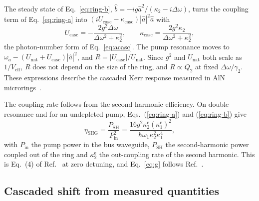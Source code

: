 \documentclass[9pt]{osa-supplemental-document}
\newcommand{\Dom}{\Delta\omega}
\begin{document}
The steady state of Eq.~\eqref{eq:ring-b},
$\hat b=-ig\hat a^2/(\kappa_2-i\Dom)$, turns the coupling term of
Eq.~\eqref{eq:ring-a} into $(iU_{\mathrm{casc}}-\kappa_{\mathrm{casc}})|\hat a|^2\hat a$
with
\begin{equation}
  U_{\mathrm{casc}}=-\frac{2g^2\Dom}{\Dom^2+\kappa_2^2},\qquad
  \kappa_{\mathrm{casc}}=\frac{2g^2\kappa_2}{\Dom^2+\kappa_2^2},
  \label{eq:Ucasc}
\end{equation}
the photon-number form of Eq.~\eqref{eq:acasc}.  The pump resonance moves to
$\omega_a-(U_{\mathrm{nat}}+U_{\mathrm{casc}})|\hat a|^2$, and
$R=|U_{\mathrm{casc}}|/U_{\mathrm{nat}}$.  Since $g^2$ and
$U_{\mathrm{nat}}$ both scale as $1/V_{\mathrm{eff}}$, $R$ does not depend on
the size of the ring, and $R\propto Q_2$ at fixed $\Dom/\gamma_2$.  These
expressions describe the cascaded Kerr response measured in AlN
microrings~\cite{cui2022,cui2025}.

The coupling rate follows from the second-harmonic efficiency.  On double
resonance and for an undepleted pump,
Eqs.~(\ref{eq:ring-a}) and (\ref{eq:ring-b}) give
\begin{equation}
  \eta_{\mathrm{SHG}}=\frac{P_{\mathrm{SH}}}{P_{\mathrm{in}}^2}
  =\frac{16g^2\kappa_2^{\mathrm e}(\kappa_1^{\mathrm e})^2}{\hbar\omega_1\kappa_2^2\kappa_1^4},
  \label{eq:etashg}
\end{equation}
with $P_{\mathrm{in}}$ the pump power in the bus waveguide,
$P_{\mathrm{SH}}$ the second-harmonic power coupled out of the ring and
$\kappa_2^{\mathrm e}$ the out-coupling rate of the second harmonic.  This
is Eq.~(4) of Ref.~\cite{lu2020} at zero detuning, and Eq.~\eqref{eq:g} follows
Ref.~\cite{lu2019}.

\subsection{Cascaded shift from measured quantities}
\end{document}
